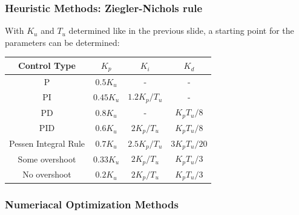 \begin{frame}
	\frametitle{Heuristic Methods: Ziegler-Nichols rule}
	With $K_u$ and $T_u$ determined like in the previous slide, a starting point for the parameters can be determined:
	\vspace{1em}
	
	\begin{tabular}{c | c | c | c}
		Control Type	&	$K_p$		&	$K_i$			&	$K_d$ 	\\
		\hline
		P				&	$0.5K_u$	&	-				&	-		\\
		PI				&	$0.45K_u$	&	$1.2K_p/T_u$		&	-		\\
		PD				&	$0.8K_u$	&	-				&	$K_pT_u/8$ \\
		PID				&	$0.6K_u$	&	$2K_p/T_u$		&	$K_pT_u/8$ \\
		Pessen Integral Rule & $0.7K_u$ &	$2.5K_p/T_u$	&	$3K_pT_u/20$\\
		Some overshoot	&	$0.33K_u$	&	$2K_p/T_u$		&	$K_pT_u/3$	\\
		No overshoot	&	$0.2K_u$	&	$2K_p/T_u$		&	$K_pT_u/3$	\\
	\end{tabular}
\end{frame}

\begin{frame}
	\frametitle{Numeriacal Optimization Methods}
	
\end{frame}
